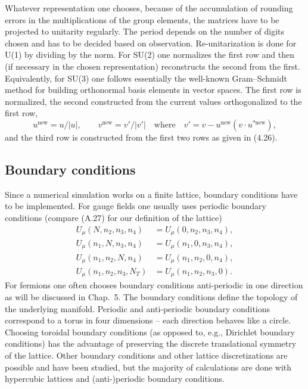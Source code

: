 Whatever representation one chooses, because of the accumulation of
rounding errors in the multiplications of the group elements, the matrices have
to be projected to unitarity regularly. The period depends on the number of
digits chosen and has to be decided based on observation. Re-unitarization
is done for U(1) by dividing by the norm. For SU(2) one normalizes the
first row and then (if necessary in the chosen representation) reconstructs
the second from the first. Equivalently, for SU(3) one follows essentially the
well-known Gram--Schmidt method for building orthonormal basis elements
in vector spaces. The first row is normalized, the second constructed from the
current values orthogonalized to the first row,
\begin{equation}
  u^{\mathrm{new}} = u/|u|, \qquad
  v^{\mathrm{new}} = v' / |v'|
  \quad\text{where}\quad
  v' = v - u^{\mathrm{new}}(v\cdot u^{*\mathrm{new}}),
\end{equation}
and the third row is constructed from the first two rows as given in (4.26).

\subsection{Boundary conditions}

Since a numerical simulation works on a finite lattice, boundary conditions
have to be implemented. For gauge fields one usually uses periodic boundary
conditions (compare (A.27) for our definition of the lattice)
\begin{equation}
  \begin{split}
    U_\mu(N, n_2, n_3, n_4) &= U_\mu(0, n_2, n_3, n_4), \\
    U_\mu(n_1, N, n_3, n_4) &= U_\mu(n_1, 0, n_3, n_4), \\
    U_\mu(n_1, n_2, N, n_4) &= U_\mu(n_1, n_2, 0, n_4), \\
    U_\mu(n_1, n_2, n_3, N_T) &= U_\mu(n_1, n_2, n_3, 0).
  \end{split}
\end{equation}
For fermions one often chooses boundary conditions anti-periodic in one direction as will be discussed in Chap.~5. The boundary conditions define the
topology of the underlying manifold. Periodic and anti-periodic boundary conditions correspond to a torus in four dimensions -- each direction behaves like
a circle. Choosing toroidal boundary conditions (as opposed to, e.g., Dirichlet
boundary conditions) has the advantage of preserving the discrete translational symmetry of the lattice. Other boundary conditions and other lattice
discretizations are possible and have been studied, but the majority of calculations are done with hypercubic lattices and (anti-)periodic boundary
conditions.

